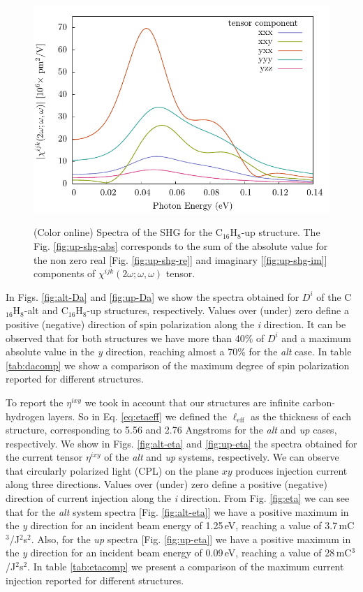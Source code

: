 \documentclass[aps,pra,11pt,tightenlines,showpacs,superscriptaddress,groupedaddress]{revtex4-1}
\newcommand{\lw}{0.55\linewidth}
\newcommand{\di}{$D^{i}$}
\newcommand{\ea}{$\eta^{ixy}$}
\newcommand{\altstc}{C$_{16}$H$_{8}$-alt}
\newcommand{\upstc}{C$_{16}$H$_{8}$-up}
\begin{document}
\begin{figure}
{            \includegraphics[width=\lw]{up/up_shg_final_abs_sm}}
    \caption{(Color online) Spectra of the SHG for the {\upstc} structure. The
    Fig. \ref{fig:up-shg-abs} corresponds to the sum of the absolute value for
    the non zero real [Fig. \ref{fig:up-shg-re}] and imaginary 
    [\ref{fig:up-shg-im}] components of $\chi^{ijk}(2\omega;\omega,\omega) $ 
    tensor.}\label{fig:shg-up}
\end{figure}


In Figs. \ref{fig:alt-Da} and \ref{fig:up-Da} we show the spectra obtained for
{\di} of the {\altstc} and {\upstc} structures, respectively. Values over
(under) zero define a positive (negative) direction of spin polarization along
the \emph{i} direction. It can be observed that for both structures we have
more than 40\% of {\di} and a maximum absolute value in the \emph{y} direction,
reaching almost a 70\% for the \emph{alt} case. In table \ref{tab:dacomp}
we show a comparison of the maximum degree of spin polarization reported for
different structures.

To report the {\ea} we took in account that our structures are infinite 
carbon-hydrogen layers. So in Eq. \ref{eq:etaeff} we defined the 
$\ell_{\text{eff}}$
as the thickness of each structure, corresponding to 5.56 and 2.76 Angstroms for 
the \emph{alt} and \emph{up} cases, respectively. We show in Figs. 
\ref{fig:alt-eta} and
\ref{fig:up-eta}  the spectra obtained for the current tensor {\ea} of the
\emph{alt} and \emph{up} systems, respectively. We can observe that
circularly polarized light (CPL) on the plane $xy$ produces injection current
along three directions. Values over (under) zero define a positive (negative)
direction of current injection along the \emph{i} direction. From Fig.
\ref{fig:eta} we can see that for the \emph{alt} system spectra [Fig.
\ref{fig:alt-eta}] we have a positive maximum in the \emph{y} direction for an
incident beam energy of 1.25\,eV, reaching a value of
3.7\,mC$^{3}$/J$^{2}$s$^{2}$. Also, for the \emph{up} spectra [Fig.
\ref{fig:up-eta}] we have a positive maximum in the \emph{y} direction for an
incident beam energy of 0.09\,eV, reaching a value of
28\,mC$^{3}$/J$^{2}$s$^{2}$. In table \ref{tab:etacomp} we present a comparison
of the maximum current injection reported for different structures.
\end{document}
